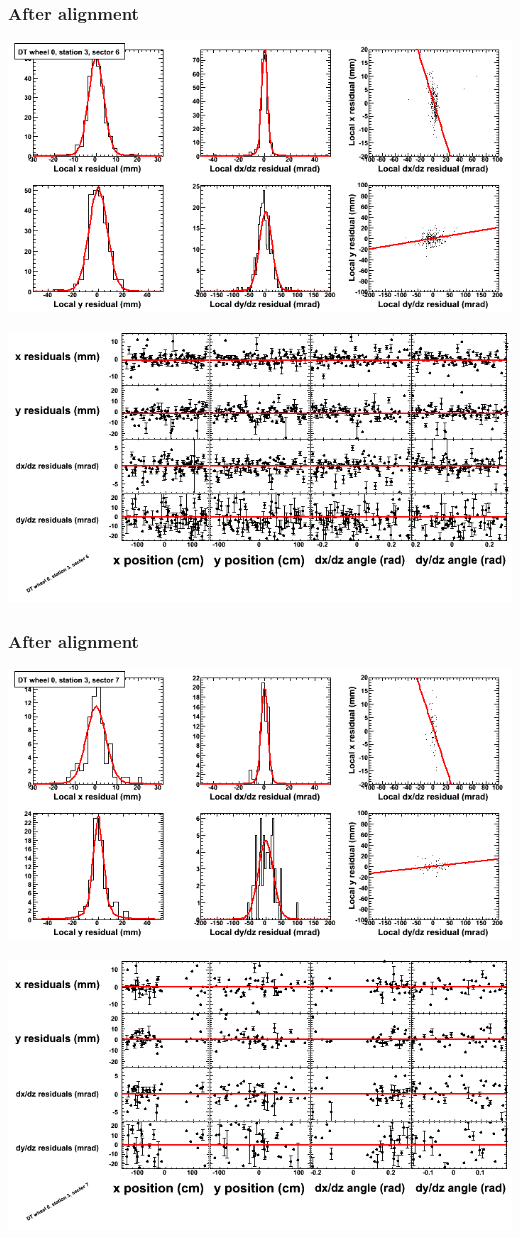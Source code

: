 \documentclass[compress]{beamer}
\begin{document}
\begin{frame}
\frametitle{After alignment}
\includegraphics[width=0.7\linewidth]{NOV4_fitfunctions/MBwhCst3sec06_bellcurves.png}

\includegraphics[width=0.7\linewidth]{NOV4_fitfunctions/MBwhCst3sec06_polynomials.png}
\end{frame}

\begin{frame}
\frametitle{After alignment}
\includegraphics[width=0.7\linewidth]{NOV4_fitfunctions/MBwhCst3sec07_bellcurves.png}

\includegraphics[width=0.7\linewidth]{NOV4_fitfunctions/MBwhCst3sec07_polynomials.png}
\end{frame}
\end{document}
